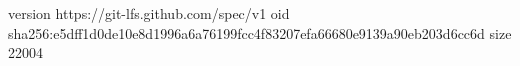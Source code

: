 version https://git-lfs.github.com/spec/v1
oid sha256:e5dff1d0de10e8d1996a6a76199fcc4f83207efa66680e9139a90eb203d6cc6d
size 22004
